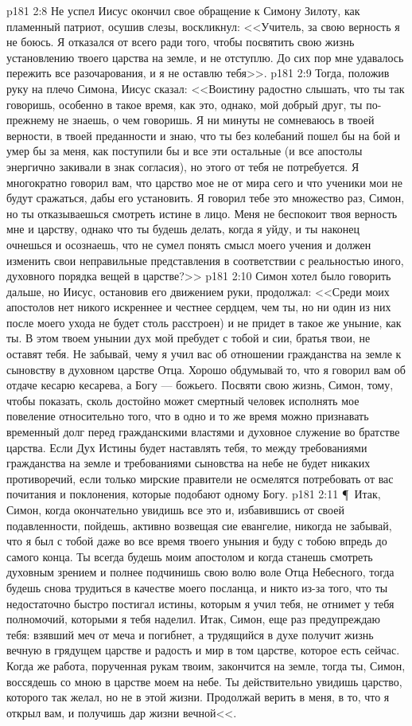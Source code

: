 \vs p181 2:8 Не успел Иисус окончил свое обращение к Симону Зилоту, как пламенный патриот, осушив слезы, воскликнул: <<Учитель, за свою верность я не боюсь. Я отказался от всего ради того, чтобы посвятить свою жизнь установлению твоего царства на земле, и не отступлю. До сих пор мне удавалось пережить все разочарования, и я не оставлю тебя>>.
\vs p181 2:9 Тогда, положив руку на плечо Симона, Иисус сказал: <<Воистину радостно слышать, что ты так говоришь, особенно в такое время, как это, однако, мой добрый друг, ты по\hyp{}прежнему не знаешь, о чем говоришь. Я ни минуты не сомневаюсь в твоей верности, в твоей преданности и знаю, что ты без колебаний пошел бы на бой и умер бы за меня, как поступили бы и все эти остальные (и все апостолы энергично закивали в знак согласия), но этого от тебя не потребуется. Я многократно говорил вам, что царство мое не от мира сего и что ученики мои не будут сражаться, дабы его установить. Я говорил тебе это множество раз, Симон, но ты отказываешься смотреть истине в лицо. Меня не беспокоит твоя верность мне и царству, однако что ты будешь делать, когда я уйду, и ты наконец очнешься и осознаешь, что не сумел понять смысл моего учения и должен изменить свои неправильные представления в соответствии с реальностью иного, духовного порядка вещей в царстве?>>
\vs p181 2:10 Симон хотел было говорить дальше, но Иисус, остановив его движением руки, продолжал: <<Среди моих апостолов нет никого искреннее и честнее сердцем, чем ты, но ни один из них после моего ухода не будет столь расстроен) и не придет в такое же уныние, как ты. В этом твоем унынии дух мой пребудет с тобой и сии, братья твои, не оставят тебя. Не забывай, чему я учил вас об отношении гражданства на земле к сыновству в духовном царстве Отца. Хорошо обдумывай то, что я говорил вам об отдаче кесарю кесарева, а Богу --- божьего. Посвяти свою жизнь, Симон, тому, чтобы показать, сколь достойно может смертный человек исполнять мое повеление относительно того, что в одно и то же время можно признавать временный долг перед гражданскими властями и духовное служение во братстве царства. Если Дух Истины будет наставлять тебя, то между требованиями гражданства на земле и требованиями сыновства на небе не будет никаких противоречий, если только мирские правители не осмелятся потребовать от вас почитания и поклонения, которые подобают одному Богу.
\vs p181 2:11 \P\ Итак, Симон, когда окончательно увидишь все это и, избавившись от своей подавленности, пойдешь, активно возвещая сие евангелие, никогда не забывай, что я был с тобой даже во все время твоего уныния и буду с тобою впредь до самого конца. Ты всегда будешь моим апостолом и когда станешь смотреть духовным зрением и полнее подчинишь свою волю воле Отца Небесного, тогда будешь снова трудиться в качестве моего посланца, и никто из\hyp{}за того, что ты недостаточно быстро постигал истины, которым я учил тебя, не отнимет у тебя полномочий, которыми я тебя наделил. Итак, Симон, еще раз предупреждаю тебя: взявший меч от меча и погибнет, а трудящийся в духе получит жизнь вечную в грядущем царстве и радость и мир в том царстве, которое есть сейчас. Когда же работа, порученная рукам твоим, закончится на земле, тогда ты, Симон, воссядешь со мною в царстве моем на небе. Ты действительно увидишь царство, которого так желал, но не в этой жизни. Продолжай верить в меня, в то, что я открыл вам, и получишь дар жизни вечной<<.
